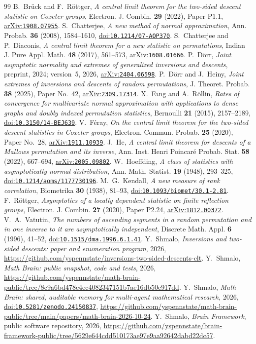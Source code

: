 \documentclass[11pt]{amsart}
\theoremstyle{remark}
\newcommand{\doi}[1]{\href{https://doi.org/#1}{doi:\nolinkurl{#1}}}
\newcommand{\arxiv}[1]{\href{https://arxiv.org/abs/#1}{arXiv:\nolinkurl{#1}}}
\begin{document}
\begin{thebibliography}{99}
 B.~Brück and F.~Röttger, \emph{A central limit theorem for the two-sided descent statistic on
Coxeter groups}, Electron. J. Combin. \textbf{29} (2022), Paper P1.1, \arxiv{1908.07955}.
 S.~Chatterjee, \emph{A new method of normal approximation}, Ann. Probab. \textbf{36} (2008),
1584--1610, \doi{10.1214/07-AOP370}.
 S.~Chatterjee and P.~Diaconis, \emph{A central limit theorem for a new statistic on permutations}, Indian
J. Pure Appl. Math. \textbf{48} (2017), 561--573, \arxiv{1608.01666}.
 P.~Dörr, \emph{Joint asymptotic normality and extremes of generalized inversions and descents},
preprint, 2024; version~5, 2026, \arxiv{2404.06598}.
 P.~Dörr and J.~Heiny, \emph{Joint extremes of inversions and descents of random permutations},
J. Theoret. Probab. \textbf{38} (2025), Paper No.~42, \arxiv{2309.17314}.
 X.~Fang and A.~Röllin, \emph{Rates of convergence for multivariate normal approximation with
applications to dense graphs and doubly indexed permutation statistics}, Bernoulli \textbf{21} (2015), 2157--2189,
\doi{10.3150/14-BEJ639}.
 V.~Féray, \emph{On the central limit theorem for the two-sided descent statistics in Coxeter
groups}, Electron. Commun. Probab. \textbf{25} (2020), Paper No.~28, \arxiv{1911.10939}.
 J.~He, \emph{A central limit theorem for descents of a Mallows permutation and its inverse}, Ann. Inst.
Henri Poincaré Probab. Stat. \textbf{58} (2022), 667--694, \arxiv{2005.09802}.
 W.~Hoeffding, \emph{A class of statistics with asymptotically normal distribution}, Ann. Math.
Statist. \textbf{19} (1948), 293--325, \doi{10.1214/aoms/1177730196}.
 M.~G.~Kendall, \emph{A new measure of rank correlation}, Biometrika \textbf{30} (1938), 81--93,
\doi{10.1093/biomet/30.1-2.81}.
 F.~Röttger, \emph{Asymptotics of a locally dependent statistic on finite reflection groups},
Electron. J. Combin. \textbf{27} (2020), Paper P2.24, \arxiv{1812.00372}.
 V.~A.~Vatutin, \emph{The numbers of ascending segments in a random permutation and in one inverse to
it are asymptotically independent}, Discrete Math. Appl. \textbf{6} (1996), 41--52, \doi{10.1515/dma.1996.6.1.41}.
 Y.~Shmalo, \emph{Inversions and two-sided descents: paper and enumeration program}, 2026,
\url{https://github.com/yspennstate/inversions-two-sided-descents-clt}.
 Y.~Shmalo, \emph{Math Brain: public snapshot, code and tests}, 2026,
\url{https://github.com/yspennstate/math-brain-public/tree/8c9a6bd478c4ec4082347151b7ae16db50c917dd}.
 Y.~Shmalo, \emph{Math Brain: shared, auditable memory for multi-agent mathematical research},
2026, \doi{10.5281/zenodo.24150837},
\url{https://github.com/yspennstate/math-brain-public/tree/main/papers/math-brain-2026-10-24}.
 Y.~Shmalo, \emph{Brain Framework}, public software repository, 2026,
\url{https://github.com/yspennstate/brain-framework-public/tree/5629e644cdd510173ae97e9aa92642dabd22dc57}.
\end{thebibliography}
\end{document}
